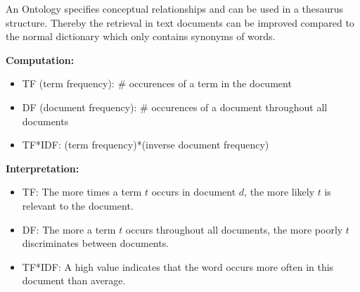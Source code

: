 \documentclass[10pt,a4paper]{scrartcl}
\begin{document}

An Ontology specifies conceptual relationships and can be used in a thesaurus structure. Thereby the retrieval in text documents can be improved compared to the normal dictionary which only contains synonyms of words.

\textbf{Computation:}
\begin{itemize}
	\item TF (term frequency): \# occurences of a term in the document
	\item DF (document frequency): \# occurences of a document throughout all documents
	\item TF*IDF: (term frequency)*(inverse document frequency)
\end{itemize}
\textbf{Interpretation:}
\begin{itemize}
	\item TF: The more times a term $t$ occurs in document $d$, the more likely $t$ is relevant to the document.
	\item DF: The more a term $t$ occurs throughout all documents, the more poorly $t$ discriminates between documents.
	\item TF*IDF: A high value indicates that the word occurs more often in this document than average.
\end{itemize}
\end{document}
